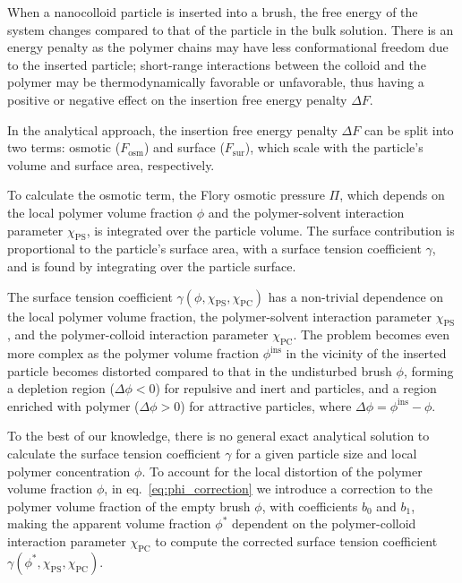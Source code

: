 \documentclass[10pt, a4paper]{article}
\begin{document}
\begin{multicols}{2}
When a nanocolloid particle is inserted into a brush, the free energy of the system changes compared to that of the particle in the bulk solution.
There is an energy penalty as the polymer chains may have less conformational freedom due to the inserted particle; short-range interactions between the colloid and the polymer may be thermodynamically favorable or unfavorable, thus having a positive or negative effect on the insertion free energy penalty $\Delta F$.

In the analytical approach, the insertion free energy penalty $\Delta F$ can be split into two terms: osmotic ($F_{\textrm{osm}}$) and surface ($F_{\textrm{sur}}$), which scale with the particle's volume and surface area, respectively.

To calculate the osmotic term, the Flory osmotic pressure $\Pi$, which depends on the local polymer volume fraction $\phi$ and the polymer-solvent interaction parameter $\chi_{\textrm{PS}}$, is integrated over the particle volume.
The surface contribution is proportional to the particle's surface area, with a surface tension coefficient $\gamma$, and is found by integrating over the particle surface.

The surface tension coefficient $\gamma(\phi, \chi_{\textrm{PS}}, \chi_{\textrm{PC}})$ has a non-trivial dependence on the local polymer volume fraction, the polymer-solvent interaction parameter $\chi_{\textrm{PS}}$, and the polymer-colloid interaction parameter $\chi_{\textrm{PC}}$.
The problem becomes even more complex as the polymer volume fraction $\phi^{\textrm{ins}}$ in the vicinity of the inserted particle becomes distorted compared to that in the undisturbed brush $\phi$, forming a depletion region ($\Delta \phi < 0$) for repulsive and inert and particles, and a region enriched with polymer ($\Delta \phi > 0$) for attractive particles, where $\Delta \phi = \phi^{\textrm{ins}} - \phi$.


To the best of our knowledge, there is no general exact analytical solution to calculate the surface tension coefficient $\gamma$ for a given particle size and local polymer concentration $\phi$.
To account for the local distortion of the polymer volume fraction $\phi$, in eq.~\ref{eq:phi_correction} we introduce a correction to the polymer volume fraction of the empty brush $\phi$, with coefficients $b_0$ and $b_1$, making the apparent volume fraction $\phi^{\ast}$ dependent on the polymer-colloid interaction parameter $\chi_{\textrm{PC}}$ to compute the corrected surface tension coefficient $\gamma(\phi^{\ast}, \chi_{\textrm{PS}}, \chi_{\textrm{PC}})$.


\end{multicols}
\end{document}
